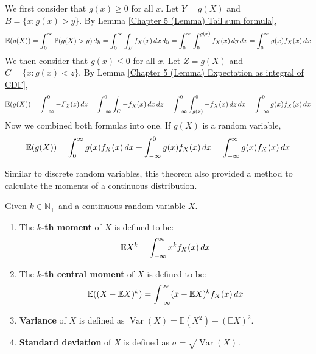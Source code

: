\documentclass{huhtakm-template-book}
\newcommand{\prob}{\mathbb{P}}
\newcommand{\expect}{\mathbb{E}}
\DeclareMathOperator{\Var}{Var}
\begin{document}
\newpage
\begin{proofing}
	We first consider that $g(x)\geq 0$ for all $x$. Let $Y=g(X)$ and $B=\{x:g(x)>y\}$. By Lemma \ref{Chapter 5 (Lemma) Tail sum formula},
	\begin{equation*}
		\expect(g(X))=\intlu{0}{\infty}\prob(g(X)>y)\,dy=\intlu{0}{\infty}\int_{B}f_{X}(x)\,dx\,dy=\intlu{0}{\infty}\intlu{0}{g(x)}f_{X}(x)\,dy\,dx=\intlu{0}{\infty}g(x)f_{X}(x)\,dx
	\end{equation*}
	We then consider that $g(x)\leq 0$ for all $x$. Let $Z=g(X)$ and $C=\{x:g(x)<z\}$. By Lemma \ref{Chapter 5 (Lemma) Expectation as integral of CDF},
	\begin{equation*}
		\expect(g(X))=\intlu{-\infty}{0}-F_{Z}(z)\,dz=\intlu{-\infty}{0}\int_{C}-f_{X}(x)\,dx\,dz=\intlu{-\infty}{0}\intlu{g(x)}{0}-f_{X}(x)\,dz\,dx=\intlu{-\infty}{0}g(x)f_{X}(x)\,dx
	\end{equation*}
	Now we combined both formulas into one. If $g(X)$ is a random variable,
	\begin{equation*}
		\expect(g(X))=\int_{0}^{\infty}g(x)f_{X}(x)\,dx+\intlu{-\infty}{0}g(x)f_{X}(x)\,dx=\intinfty g(x)f_{X}(x)\,dx
	\end{equation*}
\end{proofing}
Similar to discrete random variables, this theorem also provided a method to calculate the moments of a continuous distribution.
\begin{defn}
	Given $k\in\mathbb{N}_{+}$ and a continuous random variable $X$.
	\begin{enumerate}
		\item The \textbf{$k$-th moment} of $X$ is defined to be:
		\begin{equation*}
			\expect X^{k}=\intinfty x^{k}f_{X}(x)\,dx
		\end{equation*}
		\item The \textbf{$k$-th central moment} of $X$ is defined to be:
		\begin{equation*}
			\expect((X-\expect X)^{k})=\intinfty(x-\expect X)^{k}f_{X}(x)\,dx
		\end{equation*}
		\item \textbf{Variance} of $X$ is defined as $\Var(X)=\expect(X^{2})-(\expect X)^{2}$.
		\item \textbf{Standard deviation} of $X$ is defined as $\sigma=\sqrt{\Var(X)}$.
	\end{enumerate}
\end{defn}
\end{document}
